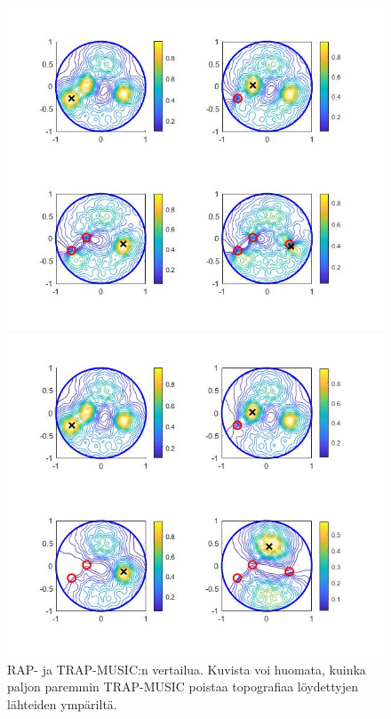 \clearpage
\begin{figure}[h]
    \begin{minipage}{0.5\textwidth}
        \centering
        \includegraphics[width=\textwidth]{RAPvsTRAP2.jpg}
    \end{minipage}
    \begin{minipage}{0.5\textwidth}
        \centering
        \includegraphics[width=\textwidth]{RAPvsTRAP1.jpg}
    \end{minipage}
    \caption{RAP- ja TRAP-MUSIC:n vertailua. Kuvista voi huomata, kuinka paljon paremmin TRAP-MUSIC poistaa topografiaa löydettyjen lähteiden ympäriltä.}
    \label{fig:rapvstrap}
\end{figure}

